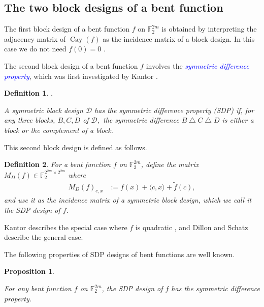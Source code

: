 \documentclass[12pt,a4paper]{article}
\newcommand{\mb}[1]{\mathbb{#1}}
\newcommand{\F}{\mb{F}}
\newcommand{\Emph}[1]{\emph{\textcolor{blue}{#1}}}
\newcommand{\Cay}[1]{\operatorname{Cay}\left(#1\right)}
\newcommand{\dual}[1]{\widetilde{#1}}
\newtheorem{Proposition}{Proposition}
\newtheorem{Definition}{Definition}
\begin{document}
%
\subsection{The two block designs of a bent function}

The first block design of a bent function $f$ on $\F_2^{2m}$ is obtained by interpreting
the adjacency matrix of $\Cay{f}$ as the incidence matrix of a block design.
In this case we do not need $f(0)=0$ \cite[p. 160]{DilS87block}.

The second block design of a bent function $f$ involves the
\Emph{symmetric difference property}, which was first investigated by Kantor
\cite[Section 5]{Kan75symplectic}.
\begin{Definition}
\label{def-Symmetric-difference-property}
\cite[p. 49]{Kan75symplectic}.

A symmetric block design $\mathcal{D}$ has the symmetric difference property (SDP)
if, for any three blocks, $B, C, D$ of $\mathcal{D},$ the symmetric difference
$B \bigtriangleup C \bigtriangleup D$ is either a block or the complement of a block.
\end{Definition}

This second block design is defined as follows.
\begin{Definition}
\label{def-SDP-design}
For a bent function  $f$ on $\F_2^{2m}$, define the matrix $M_D(f) \in \F_2^{2^{2m} \times 2^{2m}}$ where
\begin{align}
M_D(f)_{c,x} &:= f(x) + \langle c, x \rangle + \dual{f}(c),
\label{D-f-def}
\end{align}
and use it as the incidence matrix of a symmetric block design, which
we call it the \emph{SDP design} of $f$.
\end{Definition}

Kantor describes the special case where $f$ is quadratic
\cite[Section 5]{Kan75symplectic},
and Dillon and Schatz \cite{DilS87block} describe the general case.

The following properties of SDP designs of bent functions are well known.
\begin{Proposition}
\label{prop-SDP-design}
\cite[p. 160]{DilS87block} \cite[Theorem 3.29]{Neu06bent}

For any bent function $f$ on $\F_2^{2m}$, the SDP design of $f$ has the symmetric difference property.
\end{Proposition}
\end{document}
